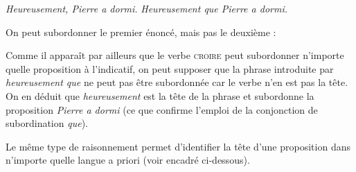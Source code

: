 \ea 
  \ea \textit{Heureusement, Pierre a dormi.}
  \ex \textit{Heureusement que Pierre a dormi.}
  \z
\z

On peut subordonner le premier énoncé, mais pas le deuxième :

\ea
  \z
\z

Comme il apparaît par ailleurs que le verbe \textsc{croire} peut subordonner n’importe quelle proposition à l’indicatif, on peut supposer que la phrase introduite par \textit{heureusement que} ne peut pas être subordonnée car le verbe n’en est pas la tête. On en déduit que \textit{heureusement} est la tête de la phrase et subordonne la proposition \textit{Pierre a dormi} (ce que confirme l’emploi de la conjonction de subordination \textit{que}).

Le même type de raisonnement permet d’identifier la tête d’une proposition dans n’importe quelle langue a priori (voir encadré ci-dessous).

